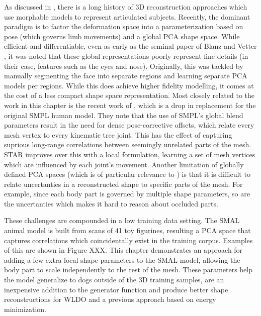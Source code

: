 As discussed in , there is a long history of 3D reconstruction approaches which use morphable models to represent articulated subjects. Recently, the dominant paradigm is to factor the deformation space into a parameterization based on pose (which governs limb movements) and a global PCA shape space. While efficient and differentiable, even as early as the seminal paper of Blanz and Vetter , it was noted that these global representations poorly represent fine details (in their case, features such as the eyes and nose). Originally, this was tackled by manually segmenting the face into separate regions and learning separate PCA models per regions. While this does achieve higher fidelity modelling, it comes at the cost of a less compact shape space representation. Most closely related to the work in this chapter is the recent work of , which is a drop in replacement for the original SMPL  human model. They note that the use of SMPL's global blend parameters result in the need for dense pose-corrective offsets, which relate every mesh vertex to every kinematic tree joint. This has the effect of capturing suprious long-range correlations between seemingly unrelated parts of the mesh. STAR improves over this with a local formulation, learning a set of mesh vertices which are influenced by each joint's movement. Another limitation of globally defined PCA spaces (which is of particular relevance to ) is that it is difficult to relate uncertanties in a reconstructed shape to specific parts of the mesh. For example, since each body part is governed by multiple shape parameters, so are the uncertanties which makes it hard to reason about occluded parts.

These challenges are compounded in a low training data setting. The SMAL animal model is built from scans of 41 toy figurines, resulting a PCA space that captures correlations which coincidentally exist in the training corpus. Examples of this are shown in Figure XXX. This chapter demonstrates an approach for adding a few extra local shape parameters to the SMAL model, allowing the body part to scale independently to the rest of the mesh. These parameters help the model generalize to dogs outside of the 3D training samples, are an inexpensive addition to the generator function and produce better shape reconstructions for WLDO and a previous approach based on energy minimization. 


